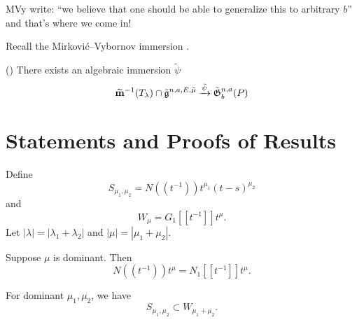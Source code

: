 \documentclass{article}
\begin{document}
MVy write: ``we believe that one should be able to generalize this to arbitrary $b$'' and that's where we come in!

Recall the Mirkovi\'c--Vybornov immersion \cite[Theorems 1.2 and 5.3]{mirkovic2007quiver}. 


\begin{theorem}(\cite[Theorem 1.2 and 5.3]{mirkovic2007quiver})
    There exists an algebraic immersion $\tilde\psi$ 
    $$\widetilde{\bf m}^{-1}(T_\lambda)\cap\tilde{\mathfrak g}^{n,a,E,\tilde\mu}\xrightarrow{\tilde\psi}\tilde{\mathfrak G}^{n,a}_{b}(P)$$
\end{theorem}



\section{Statements and Proofs of Results}

Define
\[
S_{\mu_1, \mu_2} = N((t^{-1}))t^{\mu_1}(t-s)^{\mu_2}
\]
and
\[
W_\mu = G_1 [[t^{-1}]]t^\mu.
\]
Let $|\lambda| = |\lambda_1 + \lambda_2|$ and $|\mu| = |\mu_1 + \mu_2|$.


\begin{lemma}
Suppose $\mu$ is dominant. Then 
\[
N((t^{-1})) t^\mu = N_1[[t^{-1}]] t^\mu.
\]
\end{lemma}

\begin{lemma}
For dominant $\mu_1,\mu_2$, we have
\[
S_{\mu_1, \mu_2} \subset W_{\mu_1 + \mu_2}.
\]
\end{lemma}
\end{document}

